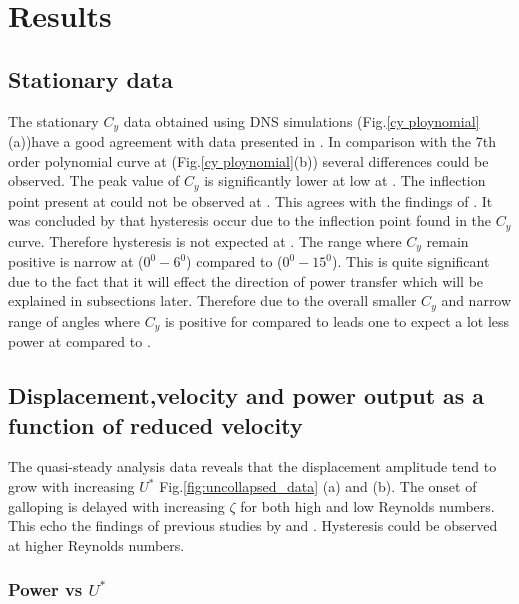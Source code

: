 
\section{Results}

\subsection{Stationary data}

The stationary $C_y$ data obtained using DNS simulations (Fig.\ref{cy ploynomial}(a))have a good agreement with data presented in \cite{Joly2012}. In comparison with the 7th order polynomial curve at  (Fig.\ref{cy ploynomial}(b))  several differences could be observed. The peak value of $C_y$ is  significantly lower at low  at . The inflection point present at  could not be observed at . This agrees with the findings of \cite{Luo2003}. It was concluded by \cite{Luo2003} that hysteresis occur due to the inflection point found in the $C_y$ curve. Therefore hysteresis is not expected at . The range where $C_y$ remain positive is narrow at  ($0^0-6^0$) compared to  ($0^0-15^0$). This is quite significant due to the fact that it will effect the direction of power transfer which will be explained in subsections later. Therefore due to the overall smaller $C_y$ and narrow range of angles where $C_y$ is positive for  compared to  leads one to expect a lot less power at compared to .

  



\subsection{Displacement,velocity and power output as a function of reduced velocity}


 The quasi-steady analysis data reveals that the displacement amplitude tend to grow with increasing $U^*$ Fig.\ref{fig:uncollapsed_data} (a) and (b). The onset of galloping is delayed with increasing $\zeta$ for both high and low Reynolds numbers. This echo the findings of previous studies by \cite{Parkinson1964} and \cite{Barrero-Gil2010a}. Hysteresis could be observed at higher Reynolds numbers.

 
 \subsubsection*{Power vs $U^*$}
 
